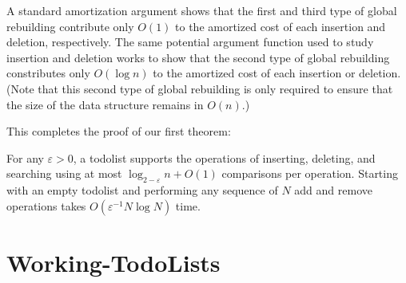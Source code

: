 \documentclass[lotsofwhite]{patmorin}
\newcommand{\eps}{\varepsilon}
\begin{document}
A standard amortization argument shows that the first and third type
of global rebuilding contribute only $O(1)$ to the amortized cost of
each insertion and deletion, respectively.  The same potential argument
function used to study insertion and deletion works to show that the
second type of global rebuilding constributes only $O(\log n)$ to the
amortized cost of each insertion or deletion.  (Note that this second
type of global rebuilding is only required to ensure that the size of
the data structure remains in $O(n)$.)

This completes the proof of our first theorem:

\begin{thm}
For any $\eps >0$, a todolist supports the operations of inserting,
deleting, and searching using at most $\log_{2-\eps} n + O(1)$ comparisons
per operation.  Starting with an empty todolist and performing any
sequence of $N$ add and remove operations takes $O(\eps^{-1}N\log
N)$ time.
\end{thm}

%
%

\section{Working-TodoLists}
\end{document}
